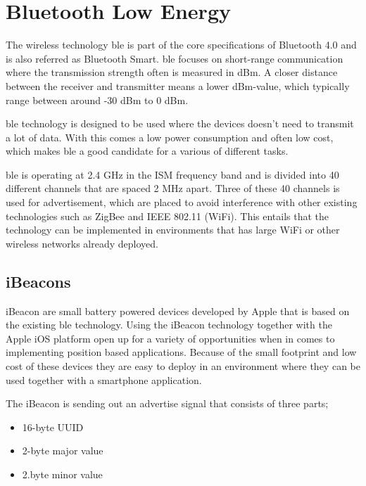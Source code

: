 \section{Bluetooth Low Energy}\label{sec:theoryBle}
The wireless technology \acrfull{ble} is part of the core specifications of Bluetooth 4.0 and is also referred as Bluetooth Smart.
\acrshort{ble} focuses on short-range communication where the transmission strength often is measured in dBm.
A closer distance between the receiver and transmitter means a lower dBm-value, which typically range between around -30 dBm to 0 dBm.
\cite{DevelopmentMobileIndoor2017} 

\bigskip

\acrshort{ble} technology is designed to be used where the devices doesn't need to transmit a lot of data.
With this comes a low power consumption and often low cost, which makes \acrshort{ble} a good candidate for a various of different tasks.
\cite{PracticalFingerprintingLocalization2017} 

\bigskip

\acrshort{ble} is operating at 2.4 GHz in the ISM frequency band and is divided into 40 different channels that are spaced 2 MHz apart.
Three of these 40 channels is used for advertisement, which are placed to avoid interference with other existing technologies such as ZigBee and IEEE 802.11 (WiFi).
This entails that the technology can be implemented in environments that has large WiFi or other wireless networks already deployed.
\cite{PracticalFingerprintingLocalization2017} 

\subsection{iBeacons}\label{sec:theoryBleiBeacons}
iBeacon are small battery powered devices developed by Apple that is based on the existing \acrshort{ble} technology.
Using the iBeacon technology together with the Apple iOS platform open up for a variety of opportunities when in comes to implementing position based applications.
Because of the small footprint and low cost of these devices they are easy to deploy in an environment where they can be used together with a smartphone application.
\cite{BluetoothLowEnergy2018} 

\bigskip

The iBeacon is sending out an advertise signal that consists of three parts;
\begin{itemize}
\item 16-byte UUID
\item 2-byte major value
\item 2.byte minor value \cite{GettingStartedIBeacon2014} 
\end{itemize}

